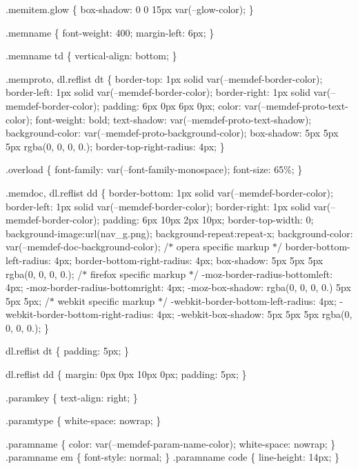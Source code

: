 .memitem.\+glow \{ box-\/shadow\+: 0 0 15px var(--glow-\/color); \}

.memname \{ font-\/weight\+: 400; margin-\/left\+: 6px; \}

.memname td \{ vertical-\/align\+: bottom; \}

.memproto, dl.\+reflist dt \{ border-\/top\+: 1px solid var(--memdef-\/border-\/color); border-\/left\+: 1px solid var(--memdef-\/border-\/color); border-\/right\+: 1px solid var(--memdef-\/border-\/color); padding\+: 6px 0px 6px 0px; color\+: var(--memdef-\/proto-\/text-\/color); font-\/weight\+: bold; text-\/shadow\+: var(--memdef-\/proto-\/text-\/shadow); background-\/color\+: var(--memdef-\/proto-\/background-\/color); box-\/shadow\+: 5px 5px 5px rgba(0, 0, 0, 0.); border-\/top-\/right-\/radius\+: 4px; \}

.overload \{ font-\/family\+: var(--font-\/family-\/monospace); font-\/size\+: 65\%; \}

.memdoc, dl.\+reflist dd \{ border-\/bottom\+: 1px solid var(--memdef-\/border-\/color); border-\/left\+: 1px solid var(--memdef-\/border-\/color); border-\/right\+: 1px solid var(--memdef-\/border-\/color); padding\+: 6px 10px 2px 10px; border-\/top-\/width\+: 0; background-\/image\+:url(\textquotesingle{}nav\+\_\+g.\+png\textquotesingle{}); background-\/repeat\+:repeat-\/x; background-\/color\+: var(--memdef-\/doc-\/background-\/color); /\texorpdfstring{$\ast$}{*} opera specific markup \texorpdfstring{$\ast$}{*}/ border-\/bottom-\/left-\/radius\+: 4px; border-\/bottom-\/right-\/radius\+: 4px; box-\/shadow\+: 5px 5px 5px rgba(0, 0, 0, 0.); /\texorpdfstring{$\ast$}{*} firefox specific markup \texorpdfstring{$\ast$}{*}/ -\/moz-\/border-\/radius-\/bottomleft\+: 4px; -\/moz-\/border-\/radius-\/bottomright\+: 4px; -\/moz-\/box-\/shadow\+: rgba(0, 0, 0, 0.) 5px 5px 5px; /\texorpdfstring{$\ast$}{*} webkit specific markup \texorpdfstring{$\ast$}{*}/ -\/webkit-\/border-\/bottom-\/left-\/radius\+: 4px; -\/webkit-\/border-\/bottom-\/right-\/radius\+: 4px; -\/webkit-\/box-\/shadow\+: 5px 5px 5px rgba(0, 0, 0, 0.); \}

dl.\+reflist dt \{ padding\+: 5px; \}

dl.\+reflist dd \{ margin\+: 0px 0px 10px 0px; padding\+: 5px; \}

.paramkey \{ text-\/align\+: right; \}

.paramtype \{ white-\/space\+: nowrap; \}

.paramname \{ color\+: var(--memdef-\/param-\/name-\/color); white-\/space\+: nowrap; \} .paramname em \{ font-\/style\+: normal; \} .paramname code \{ line-\/height\+: 14px; \}

